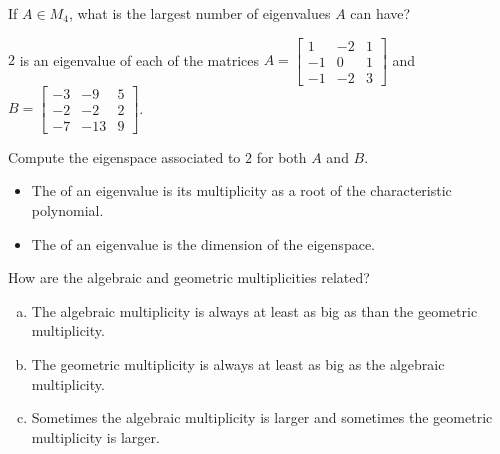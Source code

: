 
\begin{applicationActivities}{4}{28}

\begin{activity}{0}
  If $A \in M_4$, what is the largest number of eigenvalues $A$ can have?
\end{activity}

\begin{activity}{0}
  $2$ is an eigenvalue of each of the matrices $A=\begin{bmatrix} 1 & -2 & 1 \\ -1 & 0 & 1 \\ -1 & -2 & 3\end{bmatrix}$ and $B=\begin{bmatrix} -3 & -9 & 5 \\ -2 & -2 & 2 \\ -7 & -13 & 9 \end{bmatrix}$.

  Compute the eigenspace associated to $2$ for both $A$ and $B$.
\end{activity}

\begin{definition}

\begin{itemize}
\item The  of an eigenvalue is its multiplicity as a root of the characteristic polynomial.
\item The  of an eigenvalue is the dimension of the eigenspace.
\end{itemize}

\end{definition}

\begin{activity}{0} How are the algebraic and geometric multiplicities related?
\begin{enumerate}[(a)]
\item The algebraic multiplicity is always at least as big as than the geometric multiplicity.
\item The geometric multiplicity is always at least as big as the algebraic multiplicity.
\item Sometimes the algebraic multiplicity is larger and sometimes the geometric multiplicity is larger.
\end{enumerate}
\end{activity}


\end{applicationActivities}
